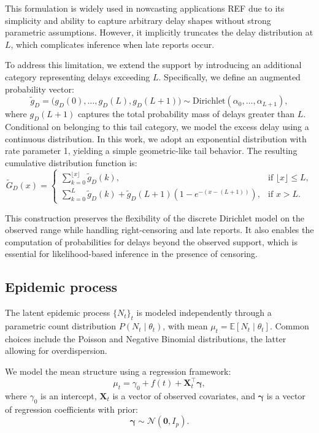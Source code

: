 \documentclass[12pt]{article}
\begin{document}
This formulation is widely used in nowcasting applications {\color{red} REF} due to its simplicity and ability to capture arbitrary delay shapes without strong parametric assumptions. However, it implicitly truncates the delay distribution at $L$, which complicates inference when late reports occur.

To address this limitation, we extend the support by introducing an additional category representing delays exceeding $L$. Specifically, we define an augmented probability vector:
\begin{equation}
    \tilde{g}_D = \big(g_D(0), \dots, g_D(L), g_D(L+1)\big) \sim \text{Dirichlet}(\alpha_0, \dots, \alpha_{L+1}),
\end{equation}
where $g_D(L+1)$ captures the total probability mass of delays greater than $L$. Conditional on belonging to this tail category, we model the excess delay using a continuous distribution. In this work, we adopt an exponential distribution with rate parameter 1, yielding a simple geometric-like tail behavior. The resulting cumulative distribution function is:
\begin{equation}
    \tilde{G}_D(x) =
    \begin{cases}
        \sum_{k=0}^{\lfloor x \rfloor} \tilde{g}_D(k), & \text{if } \lfloor x \rfloor \leq L, \\
        \sum_{k=0}^{L} \tilde{g}_D(k) + \tilde{g}_D(L+1)\left(1 - e^{-(x - (L+1))}\right), & \text{if } x > L.
    \end{cases}
\end{equation}

This construction preserves the flexibility of the discrete Dirichlet model on the observed range while handling right-censoring and late reports. It also enables the computation of probabilities for delays beyond the observed support, which is essential for likelihood-based inference in the presence of censoring.

\subsection{Epidemic process}

The latent epidemic process $\{N_t\}_t$ is modeled independently through a parametric count distribution $P(N_t \mid \theta_t)$, with mean $\mu_t = \mathbb{E}[N_t \mid \theta_t]$. Common choices include the Poisson and Negative Binomial distributions, the latter allowing for overdispersion.

We model the mean structure using a regression framework:
\begin{equation}
\mu_t = \gamma_0 + f(t) + \mathbf{X}_t^\top \boldsymbol{\gamma},
\end{equation}
where $\gamma_0$ is an intercept, $\mathbf{X}_t$ is a vector of observed covariates, and $\boldsymbol{\gamma}$ is a vector of regression coefficients with prior:
\begin{equation}
\boldsymbol{\gamma} \sim \mathcal{N}(\mathbf{0}, I_p).
\end{equation}
\end{document}

